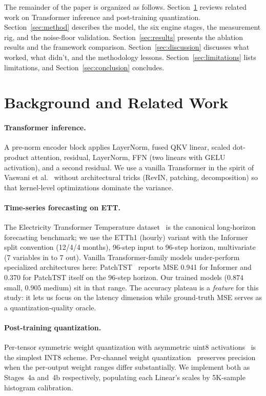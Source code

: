 \documentclass{article}
\begin{document}
The remainder of the paper is organized as follows.
Section~\ref{sec:related} reviews related work on Transformer inference and post-training quantization.
Section~\ref{sec:method} describes the model, the six engine stages, the measurement rig, and the noise-floor validation.
Section~\ref{sec:results} presents the ablation results and the framework comparison.
Section~\ref{sec:discussion} discusses what worked, what didn't, and the methodology lessons.
Section~\ref{sec:limitations} lists limitations, and Section~\ref{sec:conclusion} concludes.

\section{Background and Related Work}
\label{sec:related}

\paragraph{Transformer inference.}
A pre-norm encoder block applies LayerNorm, fused QKV linear, scaled dot-product attention, residual, LayerNorm, FFN (two linears with GELU activation), and a second residual.
We use a vanilla Transformer in the spirit of Vaswani et al.~\citep{vaswani2017attention} without architectural tricks (RevIN, patching, decomposition) so that kernel-level optimizations dominate the variance.

\paragraph{Time-series forecasting on ETT.}
The Electricity Transformer Temperature dataset~\citep{zhou2021informer} is the canonical long-horizon forecasting benchmark; we use the ETTh1 (hourly) variant with the Informer split convention (12/4/4 months), 96-step input to 96-step horizon, multivariate (7 variables in to 7 out).
Vanilla Transformer-family models under-perform specialized architectures here: PatchTST~\citep{nie2023patchtst} reports MSE 0.941 for Informer and 0.370 for PatchTST itself on the 96-step horizon.
Our trained models ($0.874$ small, $0.905$ medium) sit in that range.
The accuracy plateau is a \emph{feature} for this study: it lets us focus on the latency dimension while ground-truth MSE serves as a quantization-quality oracle.

\paragraph{Post-training quantization.}
Per-tensor symmetric weight quantization with asymmetric uint8 activations~\citep{jacob2018quantization} is the simplest INT8 scheme.
Per-channel weight quantization~\citep{krishnamoorthi2018quantizing} preserves precision when the per-output weight ranges differ substantially.
We implement both as Stages~4a and~4b respectively, populating each Linear's scales by 5K-sample histogram calibration.
\end{document}
